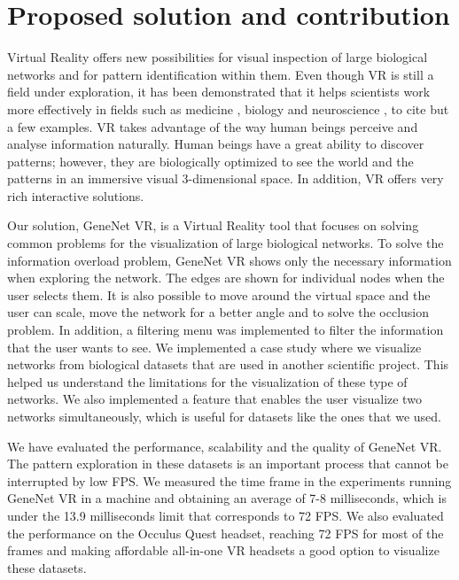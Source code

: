 \section{Proposed solution and contribution}

Virtual Reality offers new possibilities for visual inspection of large biological networks and for pattern identification within them. Even though VR is still a field under exploration, it has been demonstrated that it helps scientists work more effectively in fields such as medicine \cite{Laver11} \cite{xia_ip_samman_wong_gateno_wang_yeung_kot_tideman_2001} \cite{brain_damage_rehab}, biology \cite{bioinformatics_bti581} \cite{thorley_lawson_duca_shapiro_2008} and neuroscience \cite{bohil_alicea_biocca_2011}\cite{minderer_harvey_donato_moser_2016}, to  cite but a few examples. VR takes advantage of the way human beings perceive and analyse information naturally. Human beings have a great ability to discover patterns; however, they are biologically optimized to see the world and the patterns in an immersive visual 3-dimensional space. In addition, VR offers very rich interactive solutions.

Our solution, GeneNet VR, is a Virtual Reality tool that focuses on solving common problems for the visualization of large biological networks. To solve the information overload problem, GeneNet VR shows only the necessary information when exploring the network. The edges are shown for individual nodes when the user selects them. It is also possible to move around the virtual space and the user can scale, move the network for a better angle and to solve the occlusion problem. In addition, a filtering menu was implemented to filter the information that the user wants to see. We implemented a case study where we visualize networks from biological datasets that are used in another scientific project. This helped us understand the limitations for the visualization of these type of networks. We also implemented a feature that enables the user visualize two networks simultaneously, which is useful for datasets like the ones that we used.

We have evaluated the performance, scalability and the quality of GeneNet VR. The pattern exploration in these datasets is an important process that cannot be interrupted by low FPS. We measured the time frame in the experiments running GeneNet VR in a machine and obtaining an average of 7-8 milliseconds, which is under the 13.9 milliseconds limit that corresponds to 72 FPS. We also evaluated the performance on the Occulus Quest headset, reaching 72 FPS for most of the frames and making affordable all-in-one VR headsets a good option to visualize these datasets.

